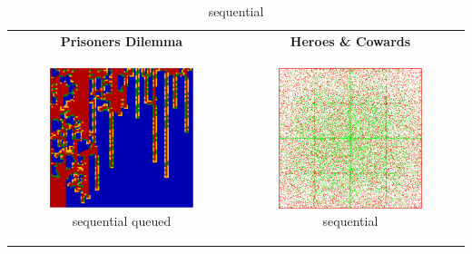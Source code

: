 \begin{table}
	\centering
	
	\begin{tabular}{c c}
		\textbf{Prisoners Dilemma} & \textbf{Heroes \& Cowards} \\ 

		
		\begin{subfigure}[b]{0.4\textwidth}
			\centering
			\includegraphics[width=.7\textwidth, angle=0]{./fig/seq_QUEUED_SG_436steps_java.png}
			\caption{sequential queued}
			\label{fig:pd_seq}
		\end{subfigure}
    	&
		\begin{subfigure}[b]{0.4\textwidth}
			\centering
			\includegraphics[width=.7\textwidth, angle=0]{./fig/seq_HAC_100_000_500steps_java.png}
			\caption{sequential}
			\label{fig:hac_seq}
		\end{subfigure}
    	\\
    	

\end{tabular}
\end{table}
